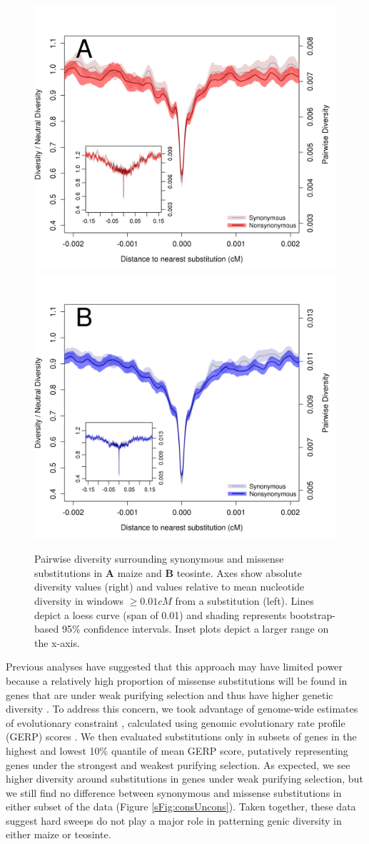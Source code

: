 \documentclass{pnastwo}
\begin{document}
\begin{article}
\begin{figure}[!tb]
\centering
\includegraphics[width=.45\textwidth]{FigsAndFiles/plotDiversity_TvM_Folded2_Significance_Aug}
\hspace{0.05\textwidth} \includegraphics[width=.45\textwidth]{FigsAndFiles/plotDiversity_TvT_Folded2_Significance_Aug}
\caption{Pairwise diversity surrounding synonymous and missense  substitutions in {\bf A} maize and {\bf B} teosinte. Axes show absolute diversity values (right) and values relative to mean nucleotide diversity in windows $\geq 0.01 cM$ from a substitution (left).  Lines depict a loess curve (span of 0.01) and shading represents bootstrap-based 95\% confidence intervals. Inset plots depict a larger range on the x-axis. \label{fig:hardSweeps}}
\end{figure}

Previous analyses have suggested that this approach may have limited power because a relatively high proportion of missense substitutions will be found in genes that are under weak purifying selection and thus have higher genetic diversity \cite{enard2014}. 
To address this concern, we took advantage of genome-wide estimates of evolutionary constraint \cite{rodgers2015}, calculated using genomic evolutionary rate profile (GERP) scores \cite{davydov2010}. 
We then evaluated substitutions only in subsets of genes in the highest and lowest 10\% quantile of mean GERP score, putatively representing genes under the strongest and weakest purifying selection. 
As expected, we see higher diversity around substitutions in genes under weak purifying selection, but we still find no difference between synonymous and missense substitutions in either subset of the data (Figure \ref{sFig:consUncons}).
Taken together, these data suggest hard sweeps do not play a major role in patterning genic diversity in either maize or teosinte.


\end{article}
\end{document}
